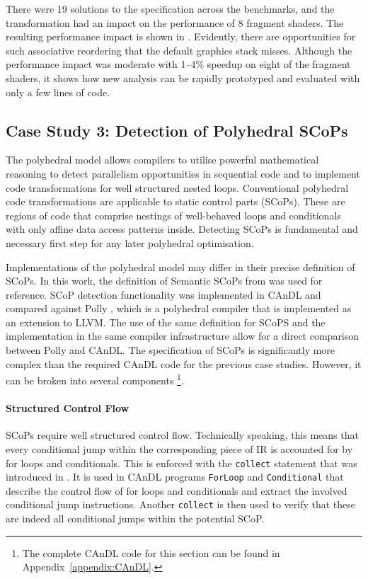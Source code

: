     There were 19 solutions to the specification across the benchmarks, and
    the transformation had an impact on the performance of 8 fragment shaders.
    The resulting performance impact is shown in .
    Evidently, there are opportunities for such associative reordering that
    the default graphics stack misses.
    Although the performance impact was moderate with 1--4\% speedup on eight
    of the fragment shaders, it shows how new analysis can be rapidly prototyped
    and evaluated with only a few lines of code.

\subsection{Case Study 3: Detection of Polyhedral SCoPs}

    The polyhedral model allows compilers to utilise powerful mathematical
    reasoning to detect parallelism opportunities in sequential code and to
    implement code transformations for well structured nested
    loops.
    Conventional polyhedral code transformations are applicable to
    static control parts (SCoPs).
    These are regions of code that comprise nestings of well-behaved loops and
    conditionals with only affine data access patterns inside.
    Detecting SCoPs is fundamental and necessary first step for any later
    polyhedral optimisation.

    Implementations of the polyhedral model may differ in their precise
    definition of SCoPs.
    In this work, the definition of Semantic SCoPs from
    \citet{Lengauer2012Polly} was used for reference.
    SCoP detection functionality was implemented in CAnDL and compared against
    Polly \citep{Lengauer2012Polly}, which is a polyhedral compiler that is
    implemented as an extension to LLVM.
    The use of the same definition for SCoPS and the implementation in the same
    compiler infrastructure allow for a direct comparison between Polly and
    CAnDL.
    The specification of SCoPs is significantly more complex than the required
    CAnDL code for the previous case studies.
    However, it can be broken into several components
    \footnote{The complete CAnDL code for this section can be found in
    Appendix~\ref{appendix:CAnDL}.}.

    \paragraph*{Structured Control Flow}
    SCoPs require well structured control flow.
    Technically speaking, this means that every conditional jump within the
    corresponding piece of IR is accounted for by for loops and conditionals.
    This is enforced with the \texttt{collect} statement that was introduced in
    .
    It is used in CAnDL programs \texttt{ForLoop} and
    \texttt{Conditional} that describe the control flow of for loops and
    conditionals and extract the involved conditional jump instructions.
    Another \texttt{collect} is then used to verify that these are indeed all
    conditional jumps within the potential SCoP.

